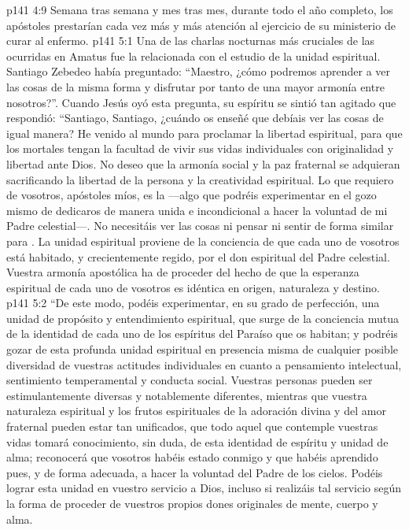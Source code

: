 \vs p141 4:9 Semana tras semana y mes tras mes, durante todo el año completo, los apóstoles prestarían cada vez más y más atención al ejercicio de su ministerio de curar al enfermo.
\vs p141 5:1 Una de las charlas nocturnas más cruciales de las ocurridas en Amatus fue la relacionada con el estudio de la unidad espiritual. Santiago Zebedeo había preguntado: “Maestro, ¿cómo podremos aprender a ver las cosas de la misma forma y disfrutar por tanto de una mayor armonía entre nosotros?”. Cuando Jesús oyó esta pregunta, su espíritu se sintió tan agitado que respondió: “Santiago, Santiago, ¿cuándo os enseñé que debíais ver las cosas de igual manera? He venido al mundo para proclamar la libertad espiritual, para que los mortales tengan la facultad de vivir sus vidas individuales con originalidad y libertad ante Dios. No deseo que la armonía social y la paz fraternal se adquieran sacrificando la libertad de la persona y la creatividad espiritual. Lo que requiero de vosotros, apóstoles míos, es la  ---algo que podréis experimentar en el gozo mismo de dedicaros de manera unida e incondicional a hacer la voluntad de mi Padre celestial---. No necesitáis ver las cosas ni pensar ni sentir de forma similar para . La unidad espiritual proviene de la conciencia de que cada uno de vosotros está habitado, y crecientemente regido, por el don espiritual del Padre celestial. Vuestra armonía apostólica ha de proceder del hecho de que la esperanza espiritual de cada uno de vosotros es idéntica en origen, naturaleza y destino.
\vs p141 5:2 “De este modo, podéis experimentar, en su grado de perfección, una unidad de propósito y entendimiento espiritual, que surge de la conciencia mutua de la identidad de cada uno de los espíritus del Paraíso que os habitan; y podréis gozar de esta profunda unidad espiritual en presencia misma de cualquier posible diversidad de vuestras actitudes individuales en cuanto a pensamiento intelectual, sentimiento temperamental y conducta social. Vuestras personas pueden ser estimulantemente diversas y notablemente diferentes, mientras que vuestra naturaleza espiritual y los frutos espirituales de la adoración divina y del amor fraternal pueden estar tan unificados, que todo aquel que contemple vuestras vidas tomará conocimiento, sin duda, de esta identidad de espíritu y unidad de alma; reconocerá que vosotros habéis estado conmigo y que habéis aprendido pues, y de forma adecuada, a hacer la voluntad del Padre de los cielos. Podéis lograr esta unidad en vuestro servicio a Dios, incluso si realizáis tal servicio según la forma de proceder de vuestros propios dones originales de mente, cuerpo y alma.
